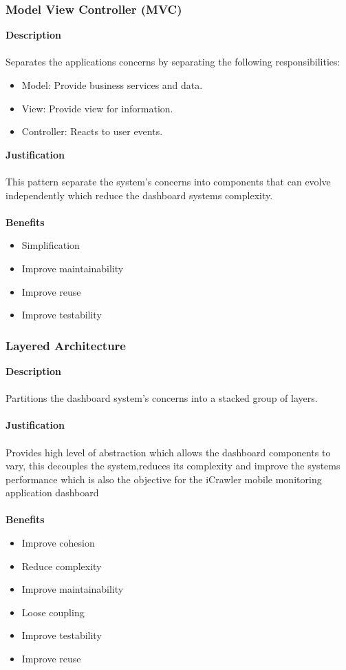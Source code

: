     \subsubsection{Model View Controller (MVC)}
    \textbf{Description}\\\\
    Separates the applications concerns by separating the following responsibilities:
    \begin{itemize}
    \item Model: Provide business services and data.
    \item View: Provide view for information.
    \item Controller: Reacts to user events. 
    \end{itemize}
    \textbf{Justification}\\\\
    This pattern separate the system's concerns into components that can evolve independently which reduce the dashboard systems complexity.\\\\
    \textbf{Benefits}
    \begin{itemize}
    \item Simplification
    \item Improve maintainability
    \item Improve reuse
    \item Improve testability 
	\end{itemize} 
	
	\newpage
	\subsubsection{Layered Architecture}
	\textbf{Description}\\\\
	Partitions the dashboard system's concerns into a stacked group of layers.\\\\
	\textbf{Justification}\\\\
	Provides high level of abstraction which allows the dashboard components to vary, this decouples the system,reduces its complexity and improve the systems performance which is also the objective for the iCrawler mobile monitoring application dashboard\\\\
	\textbf{Benefits}
	\begin{itemize}
	\item Improve cohesion
	\item Reduce complexity
	\item Improve maintainability
	\item Loose coupling
	\item Improve testability
	\item Improve reuse
	\end{itemize}
	\newpage
